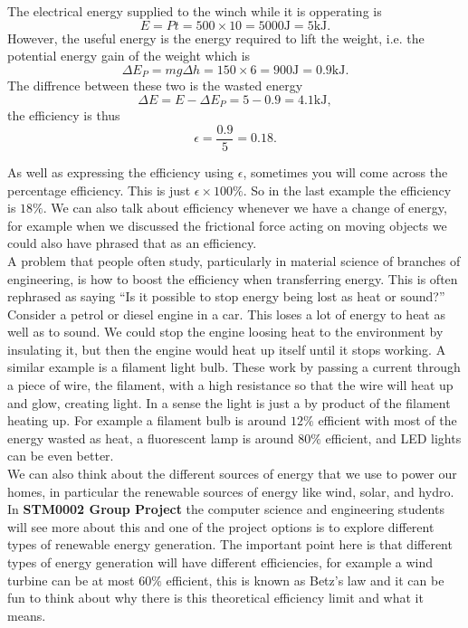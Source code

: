 \documentclass[a4paper,12pt]{book}
\begin{document}
The electrical energy supplied to the winch while it is opperating is
\begin{equation*}
E=Pt=500\times 10=5000\text{J} = 5\text{kJ}.
\end{equation*}
However, the useful energy is the energy required to lift the weight, i.e. the potential energy gain of the weight which is
\begin{equation*}
\Delta E_{P}=mg \Delta h=150\times 6=900\text{J}=0.9\text{kJ}.
\end{equation*}
The diffrence between these two is the wasted energy
\begin{equation*}
\Delta E= E-\Delta E_{P}=5-0.9=4.1\text{kJ},
\end{equation*}
the efficiency is thus 
\begin{equation*}
\epsilon =\frac{0.9}{5}=0.18.
\end{equation*}

As well as expressing the efficiency using $\epsilon$, sometimes you will come across the percentage efficiency. This is just $\epsilon\times 100\%$. So in the last example the efficiency is $18\%$. We can also talk about efficiency whenever we have a change of energy, for example when we discussed the frictional force acting on moving objects we could also have phrased that as an efficiency. \\

A problem that people often study, particularly in material science of branches of engineering, is how to boost the efficiency when transferring energy. This is often rephrased as saying ``Is it possible to stop energy being lost as heat or sound?''\\

Consider a petrol or diesel engine in a car. This loses a lot of energy to heat as well as to sound. We could stop the engine loosing heat to the environment by insulating it, but then the engine would heat up itself until it stops working.  A similar example is a filament light bulb. These work by passing a current through a piece of wire, the filament, with a high resistance so that the wire will heat up and glow, creating light. In a sense the light is just a by product of the filament heating up. For example a filament bulb is around $12\%$ efficient with most of the energy wasted as heat, a fluorescent lamp is around $80\%$ efficient, and LED lights can be even better.\\

We can also think about the different sources of energy that we use to power our homes, in particular the renewable sources of energy like wind, solar, and hydro. In \textbf{STM0002 Group Project} the computer science and engineering students will see more about this and one of the project options is to explore different types of renewable energy generation. The important point here is that different types of energy generation will have different efficiencies, for example a wind turbine can be at most $60\%$ efficient, this is known as Betz's law and it can be fun to think about why there is this theoretical efficiency limit and what it means.\\
\end{document}
